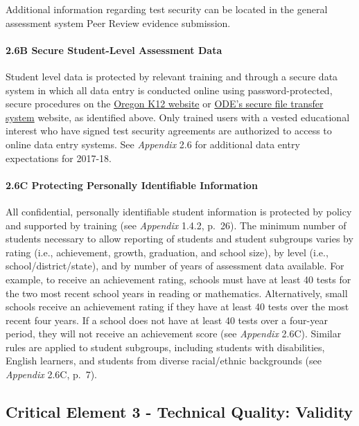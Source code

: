 \documentclass[]{article}
\let\oldparagraph\paragraph
\renewcommand{\paragraph}[1]{\oldparagraph{#1}\mbox{}}
\begin{document}
Additional information regarding test security can be located in the
general assessment system Peer Review evidence submission.

\paragraph{2.6B Secure Student-Level Assessment
Data}\label{b-secure-student-level-assessment-data}

Student level data is protected by relevant training and through a
secure data system in which all data entry is conducted online using
password-protected, secure procedures on the \color{link}
\href{https://or.k12test.com}{Oregon K12 website} \color{black} or
\color{link} \href{https://district.ode.state.or.us/apps/login/}{ODE's
secure file transfer system} \color{black} website, as identified above.
Only trained users with a vested educational interest who have signed
test security agreements are authorized to access to online data entry
systems. See \emph{Appendix} 2.6 for additional data entry expectations
for 2017-18.

\paragraph{2.6C Protecting Personally Identifiable
Information}\label{c-protecting-personally-identifiable-information}

All confidential, personally identifiable student information is
protected by policy and supported by training (see \emph{Appendix}
1.4.2, p.~26). The minimum number of students necessary to allow
reporting of students and student subgroups varies by rating (i.e.,
achievement, growth, graduation, and school size), by level (i.e.,
school/district/state), and by number of years of assessment data
available. For example, to receive an achievement rating, schools must
have at least 40 tests for the two most recent school years in reading
or mathematics. Alternatively, small schools receive an achievement
rating if they have at least 40 tests over the most recent four years.
If a school does not have at least 40 tests over a four-year period,
they will not receive an achievement score (see \emph{Appendix} 2.6C).
Similar rules are applied to student subgroups, including students with
disabilities, English learners, and students from diverse racial/ethnic
backgrounds (see \emph{Appendix} 2.6C, p.~7).

\subsection{Critical Element 3 - Technical Quality:
Validity}\label{critical-element-3---technical-quality-validity}
\end{document}
